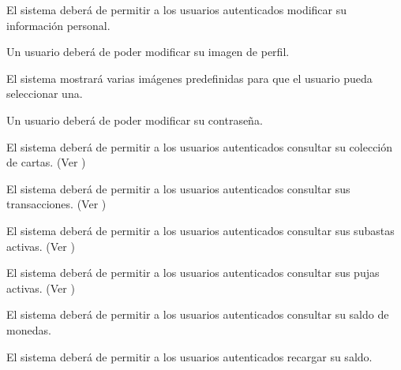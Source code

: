 

\begin{RFUsuarioAutenticado}
	\item El sistema deberá de permitir a los usuarios autenticados modificar su información personal.
    \begin{RFUsuarioAutenticado}
        \item Un usuario deberá de poder modificar su imagen de perfil.
        \begin{RFUsuarioAutenticado}
            \item El sistema mostrará varias imágenes predefinidas para que el usuario pueda seleccionar una.
        \end{RFUsuarioAutenticado}
        \item Un usuario deberá de poder modificar su contraseña.
    \end{RFUsuarioAutenticado}
    \item El sistema deberá de permitir a los usuarios autenticados consultar su colección de cartas. (Ver )
    \item El sistema deberá de permitir a los usuarios autenticados consultar sus transacciones. (Ver )
    \item El sistema deberá de permitir a los usuarios autenticados consultar sus subastas activas. (Ver )
    \item El sistema deberá de permitir a los usuarios autenticados consultar sus pujas activas. (Ver )
    \item El sistema deberá de permitir a los usuarios autenticados consultar su saldo de monedas. 
    \item El sistema deberá de permitir a los usuarios autenticados recargar su saldo.

\end{RFUsuarioAutenticado}
